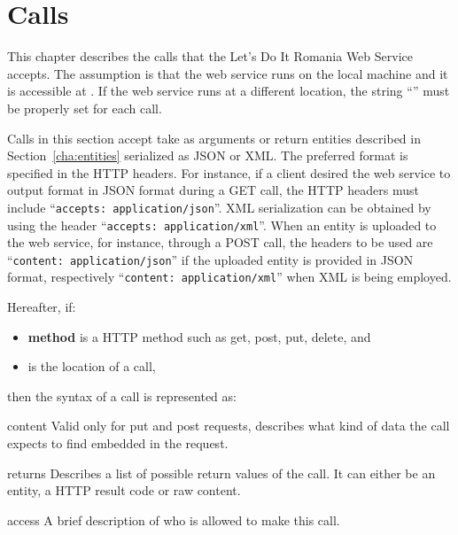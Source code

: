 \chapter{Calls}
\label{cha:calls}

This chapter describes the calls that the Let's Do It Romania Web Service
accepts. The assumption is that the web service runs on the local machine and it
is accessible at \baselocation. If the web service runs at a different location,
the string ``\baselocation'' must be properly set for each call.

Calls in this section accept take as arguments or return entities described in
Section~\ref{cha:entities} serialized as JSON or XML. The preferred format is
specified in the HTTP headers. For instance, if a client desired the web service
to output format in JSON format during a GET call, the HTTP headers must include
``\texttt{accepts: application/json}''. XML serialization can be obtained by
using the header ``\texttt{accepts: application/xml}''. When an entity is
uploaded to the web service, for instance, through a POST call, the headers to
be used are ``\texttt{content: application/json}'' if the uploaded entity is
provided in JSON format, respectively ``\texttt{content: application/xml}'' when
XML is being employed.

Hereafter, if:
\begin{itemize}
  \item {\sffamily \bfseries method} is a HTTP method such as get, post, put,
    delete, and
  \item \texttt{} is the location of a call,
\end{itemize}
then the syntax of a call is represented as:

\bigskip

\begin{apidata}{content}
  Valid only for put and post requests, describes what kind of data the call
  expects to find embedded in the request.
\end{apidata}
\begin{apidata}{returns}
  Describes a list of possible return values of the call. It can either be an
  entity, a HTTP result code or raw content.
\end{apidata}
\begin{apidata}{access}
  A brief description of who is allowed to make this call.
\end{apidata}









